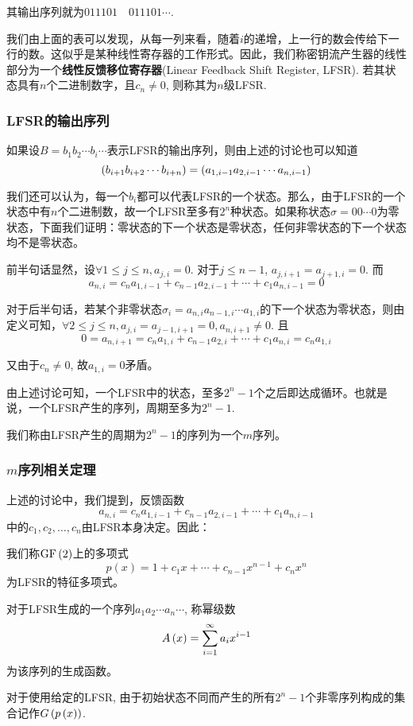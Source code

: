 其输出序列就为$011101\quad 011101\cdots$.\par
我们由上面的表可以发现，从每一列来看，随着$i$的递增，上一行的数会传给下一行的数。这似乎是某种线性寄存器的工作形式。因此，我们称密钥流产生器的线性部分为一个\textbf{线性反馈移位寄存器}(Linear Feedback Shift Register, LFSR). 若其状态具有$n$个二进制数字，且$c_n\neq 0$, 则称其为$n$级LFSR.
\subsubsection{LFSR的输出序列}
如果设$B=b_1b_2\cdots b_i\cdots $表示LFSR的输出序列，则由上述的讨论也可以知道
\begin{equation}
    \left( {b_{i+1}b_{i+2}\cdots b_{i+n}}\right)=\left( {a_{1, i-1}a_{2, i-1}\cdots a_{n, i-1}}\right)
\end{equation}

我们还可以认为，每一个$b_i$都可以代表LFSR的一个状态。那么，由于LFSR的一个状态中有$n$个二进制数，故一个LFSR至多有$2^n$种状态。如果称状态$\sigma=00\cdots 0$为零状态，下面我们证明：零状态的下一个状态是零状态，任何非零状态的下一个状态均不是零状态。
\begin{prove}
前半句话显然，设$\forall 1\leq j\leq n, a_{j, i}=0$. 对于$j\leq n-1$, $a_{j, i+1}=a_{j+1, i}=0$. 而
\[a_{n, i}=c_na_{1, i-1}+c_{n-1}a_{2, i-1}+\cdots +c_1a_{n, i-1}=0\]

对于后半句话，若某个非零状态$\sigma_i=a_{n, i}a_{n-1, i}\cdots a_{1, i}$的下一个状态为零状态，则由定义可知，$\forall 2\leq j\leq n, a_{j, i}=a_{j-1, i+1}=0, a_{n, i+1}\neq 0$. 且
\[0=a_{n, i+1}=c_na_{1, i}+c_{n-1}a_{2, i}+\cdots +c_1a_{n, i}=c_na_{1, i}\]

又由于$c_n\neq 0$, 故$a_{1, i}=0$矛盾。
\end{prove}

由上述讨论可知，一个LFSR中的状态，至多$2^n-1$个之后即达成循环。也就是说，一个LFSR产生的序列，周期至多为$2^n-1$. 
\begin{Definition}
    我们称由LFSR产生的周期为$2^n-1$的序列为一个$m$序列。
\end{Definition}
\subsubsection{$m$序列相关定理}
上述的讨论中，我们提到，反馈函数
\[a_{n, i}=c_na_{1, i-1}+c_{n-1}a_{2, i-1}+\cdots +c_1a_{n, i-1}\]
中的$c_1, c_2,\ldots ,c_n$由LFSR本身决定。因此：
\begin{Definition}
    我们称$\mathrm{GF}\left( {2}\right)$上的多项式
\begin{equation}
    p(x)=1+c_1x+\cdots +c_{n-1}x^{n-1}+c_nx^n
\end{equation}
为LFSR的特征多项式。\par
对于LFSR生成的一个序列$a_1a_2\cdots a_n\cdots$, 称幂级数
\begin{equation}
    A\left( {x}\right)=\sum_{i=1}^{\infty}a_ix^{i-1}
\end{equation}
为该序列的生成函数。\par
对于使用给定的LFSR, 由于初始状态不同而产生的所有$2^n-1$个非零序列构成的集合记作$G\left( {p\left( {x}\right)}\right)$.
\end{Definition}

